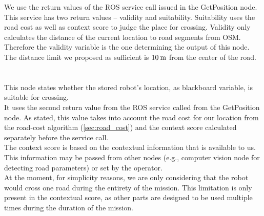         We use the return values of the ROS service call issued in the GetPosition node. This service has two return values -- validity and suitability. Suitability uses the road cost as well as context score to judge the place for crossing. Validity only calculates the distance of the current location to road segments from OSM.\\
        Therefore the validity variable is the one determining the output of this node. The distance limit we proposed as sufficient is $10\:\rm{m}$ from the center of the road.\\\\
    \\
        This node states whether the stored robot's location, as blackboard variable, is suitable for crossing.\\
        It uses the second return value from the ROS service called from the GetPosition node. As stated, this value takes into account the road cost for our location from the road-cost algorithm (\ref{sec:road_cost}) and the context score calculated separately before the service call.\\
        The context score is based on the contextual information that is available to us. This information may be passed from other nodes (e.g., computer vision node for detecting road parameters) or set by the operator.\\
        At the moment, for simplicity reasons, we are only considering that the robot would cross one road during the entirety of the mission. This limitation is only present in the contextual score, as other parts are designed to be used multiple times during the duration of the mission.